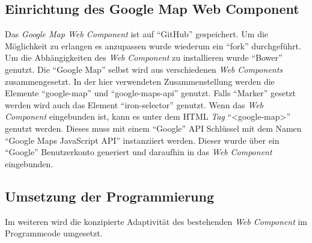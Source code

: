\documentclass[12pt, paper=a4, bibtotoc, toc=listof, headsepline=true, numbers=endperiod]{scrreprt}
\begin{document}
	\subsection{Einrichtung des Google Map Web Component}
	Das \emph{Google Map Web Component} ist auf \enquote{GitHub} gespeichert. Um die Möglichkeit zu erlangen es anzupassen wurde wiederum ein \enquote{fork} durchgeführt. Um die Abhängigkeiten des \emph{Web Component} zu installieren wurde \enquote{Bower} genutzt. Die \enquote{Google Map} selbst wird aus verschiedenen \emph{Web Components} zusammengesetzt. In der hier verwendeten Zusammenstellung werden die Elemente \enquote{google-map} und \enquote{google-maps-api} genutzt. Falls \enquote{Marker} gesetzt werden wird  auch das Element \enquote{iron-selector} genutzt. Wenn das \emph{Web Component} eingebunden ist, kann es unter dem \ac{HTML} \emph{Tag}  \enquote{<google-map>} genutzt werden. Dieses muss mit einem \enquote{Google} \ac{API} Schlüssel mit dem Namen \enquote{Google Maps JavaScript API} instanziiert werden. Dieser wurde über ein \enquote{Google} Benutzerkonto generiert und daraufhin in das \emph{Web Component} eingebunden. 
	\subsection{Umsetzung der Programmierung}
	Im weiteren wird die konzipierte Adaptivität des bestehenden \emph{Web Component} im Programmcode umgesetzt.
\end{document}
